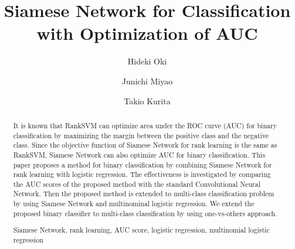 \documentclass[runningheads,a4paper]{llncs}
\newcommand{\keywords}[1]{\par\addvspace\baselineskip
\noindent\keywordname\enspace\ignorespaces#1}
\begin{document}
\mainmatter  %

\title{Siamese Network for Classification with Optimization of AUC}


%
%
\author{Hideki Oki%
\and Junichi Miyao \and Takio Kurita}
%


%
%

\maketitle


\begin{abstract}
It is known that RankSVM can optimize area under the ROC curve (AUC) for binary classification by maximizing the margin between the positive class and the negative class.
Since the objective function of Siamese Network for rank learning is the same as RankSVM, 
Siamese Network can also optimize AUC for binary classification.
This paper proposes a method for binary classification by combining Siamese Network for rank learning with logistic regression.
The effectiveness is investigated by comparing the AUC scores of the proposed method with the standard Convolutional Neural Network. 
Then the proposed method is extended to multi-class classification problem by using Siamese Network and multinominal logistic regression.
We extend the proposed binary classifier to multi-class classification by using
one-vs-others approach. 
\keywords{Siamese Network, rank learning, AUC score, logistic regression, multinomial logistic regression}
\end{abstract}
\end{document}
